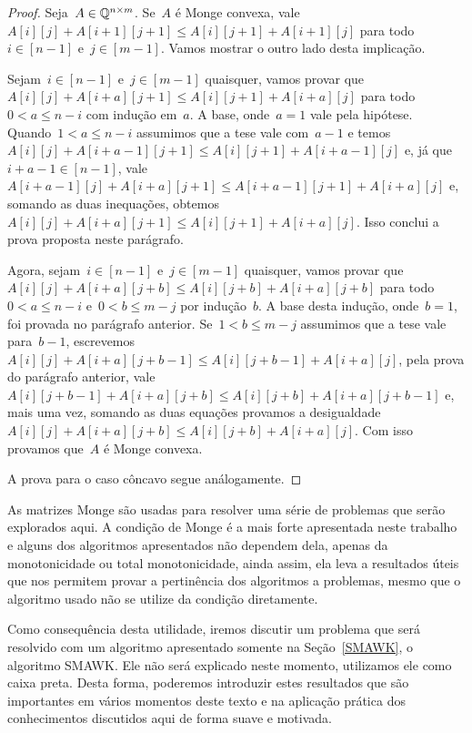 \begin{proof}
Seja~$A \in \mathbb{Q}^{n \times m}$. Se~$A$ é Monge convexa, vale~${A[i][j] + A[i+1][j+1] \leq A[i][j+1] + A[i+1][j]}$ para todo~${i \in [n-1]}$ e~${j \in [m-1]}$. Vamos mostrar o outro lado desta implicação.

Sejam~${i \in [n-1]}$ e~${j \in [m-1]}$ quaisquer, vamos provar que~${A[i][j] + A[i+a][j+1] \leq A[i][j+1] + A[i+a][j]}$ para todo~${0 < a \leq n - i}$ com indução em~$a$. A base, onde~${a = 1}$ vale pela hipótese. Quando~${1 < a \leq n-i}$ assumimos que a tese vale com~${a-1}$ e temos~${A[i][j] + A[i+a-1][j+1] \leq A[i][j+1] + A[i+a-1][j]}$ e, já que~${i + a - 1 \in [n-1]}$, vale~$A[i+a-1][j] + A[i+a][j+1] \leq A[i+a-1][j+1] + A[i+a][j]$ e, somando as duas inequações, obtemos~${A[i][j] + A[i+a][j+1] \leq A[i][j+1] + A[i+a][j]}$. Isso conclui a prova proposta neste parágrafo.

Agora, sejam~${i \in [n-1]}$ e~${j \in [m-1]}$ quaisquer, vamos provar que~${A[i][j] + A[i+a][j+b] \leq A[i][j+b] + A[i+a][j+b]}$ para todo~${0 < a \leq n-i}$ e~${0 < b \leq m-j}$ por indução~$b$. A base desta indução, onde~${b = 1}$, foi provada no parágrafo anterior. Se~${1 < b \leq m-j}$ assumimos que a tese vale para~${b-1}$, escrevemos~${A[i][j] + A[i+a][j+b-1] \leq A[i][j+b-1] + A[i+a][j]}$, pela prova do parágrafo anterior, vale~$A[i][j+b-1] + A[i+a][j+b] \leq A[i][j+b] + A[i+a][j+b-1]$ e, mais uma vez, somando as duas equações provamos a desigualdade~${A[i][j] + A[i+a][j+b] \leq A[i][j+b] + A[i+a][j]}$. Com isso provamos que~$A$ é Monge convexa.

A prova para o caso côncavo segue análogamente.
\end{proof}

As matrizes Monge são usadas para resolver uma série de problemas que serão explorados aqui. A condição de Monge é a mais forte apresentada neste trabalho e alguns dos algoritmos apresentados não dependem dela, apenas da monotonicidade ou total monotonicidade, ainda assim, ela leva a resultados úteis que nos permitem provar a pertinência dos algoritmos a problemas, mesmo que o algoritmo usado não se utilize da condição diretamente.  

Como consequência desta utilidade, iremos discutir um problema que será resolvido com um algoritmo apresentado somente na Seção~\ref{SMAWK}, o algoritmo SMAWK. Ele não será explicado neste momento, utilizamos ele como caixa preta. Desta forma, poderemos introduzir estes resultados que são importantes em vários momentos deste texto e na aplicação prática dos conhecimentos discutidos aqui de forma suave e motivada.   

